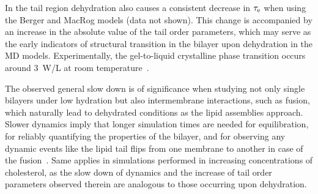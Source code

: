 \documentclass[journal=jpcbfk,manuscript=article,layout=twocolumn]{achemso}
\begin{document}

  
In the tail region dehydration also causes a consistent decrease in $\tau_{\rm{e}}$ when using the Berger and MacRog models (data not shown). This change is accompanied by an increase in the absolute value of the tail order parameters, which may serve as the early indicators of structural transition in the bilayer upon dehydration in the MD models.  Experimentally, the gel-to-liquid crystalline phase transition occurs around 3~W/L at room temperature~\cite{lynch89}.

The observed general slow down is of significance when studying not only single bilayers under low hydration but also intermembrane interactions, such as fusion, which naturally lead to dehydrated conditions as the lipid assemblies approach. Slower dynamics imply that longer simulation times are needed for equilibration, for reliably quantifying the properties of the bilayer, and for observing any dynamic events like the lipid tail flips from one membrane to another in case of the fusion~\cite{best citation here}. Same applies in simulations performed in increasing concentrations of cholesterol, as the slow down of dynamics and the increase of tail order parameters observed therein are analogous to those occurring upon dehydration. 
\end{document}
